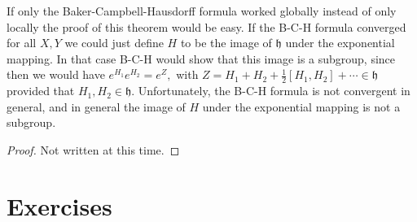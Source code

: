 \documentclass[12pt]{amsbook}
\let \frak = \mathfrak
\theoremstyle{plain}
\numberwithin{equation}{chapter}
\numberwithin{theorem}{chapter}
\begin{document}
If only the Baker-Campbell-Hausdorff formula worked globally instead of only
locally the proof of this theorem would be easy. If the B-C-H formula
converged for all $X,Y$ we could just define $H$ to be the image of $\frak{h}$
under the exponential mapping. In that case B-C-H would show that this image
is a subgroup, since then we would have $e^{H_{1}}e^{H_{2}}=e^{Z},$ with
$Z=H_{1}+H_{2}+\frac{1}{2}\left[  H_{1},H_{2}\right]  +\cdots\in\frak{h}$
provided that $H_{1},H_{2}\in\frak{h}.$ Unfortunately, the B-C-H formula is
not convergent in general, and in general the image of $H$ under the
exponential mapping is not a subgroup.

\begin{proof}
Not written at this time.
\end{proof}

\section{Exercises}
\end{document}

